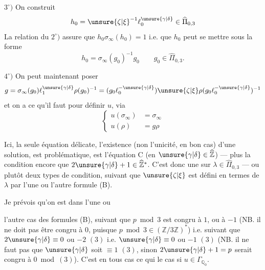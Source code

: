 
$3^\circ)$ On construit 
\[
h_0=\unsure{\zeta|\xi}^{-1}\ell_0^{\unsure{\gamma|\delta}}
\in\widehat{\Pi}_{0,3}
\]
La relation du $2^\circ)$ assure que $h_0\sigma_\infty(h_0)=1$ i.e.
que $h_0$ peut se mettre sous la forme
\[
h_0=\sigma_\infty(g_0)^{-1}g_0
\qquad g_0\in\widehat{\Pi}_{0,3}.
\]


$4^\circ)$ On peut maintenant poser
\[
g=\sigma_\infty(g_0)\ell_1^{\unsure{\gamma|\delta}}\rho(g_0)^{-1}
=(g_0\ell_0^{-\unsure{\gamma|\delta}})\unsure{\zeta|\xi}
\rho(g_0\ell_0^{-\unsure{\gamma|\delta}})^{-1}
\]
et on  a ce qu'il faut pour définir $u$, via
\[
\left\{
\begin{aligned}
u(\sigma_\infty)&=\sigma_\infty\\
u(\rho)&=g\rho
\end{aligned}
\right.
\]

Ici, la seule équation délicate,  
l'existence (non l'unicité, en bon cas) d'une solution, est problématique,
est l'équation C (en $\unsure{\gamma|\delta}\in\widehat{\mathbb Z}$)
--- plus la condition encore que $2\unsure{\gamma|\delta}+1\in\widehat{\mathbb Z}^{*}$.
C'est donc une 
sur $\lambda\in\widehat{\Pi}_{0,3}$ --- ou plutôt deux types de condition,
suivant que $\unsure{\zeta|\xi}$ est défini en termes de $\lambda$ par
l'une ou l'autre formule (B).

Je prévois qu'on est dans l'une ou



l'autre cas des formules (B), suivant que $p\bmod 3$ est congru à $1$, ou à $-1$
(NB. il ne doit pas être congru à $0$, puisque $p\bmod 3\in(\mathbb Z/3\mathbb Z)^*$)
i.e. suivant que $2\unsure{\gamma|\delta}\equiv 0$ ou $-2$ $(3)$ i.e.
$\unsure{\gamma|\delta}\equiv 0$ ou $-1$ $(3)$
(NB. il ne faut pas que $\unsure{\gamma|\delta}$ soit $\equiv 1$ $(3)$,
sinon $2\unsure{\gamma|\delta}+1=p$ serait congru à $0\bmod(3)$).
C'est en tous cas ce qui  le cas si $u\in\Gamma_{\mathbb Q_0}$.

